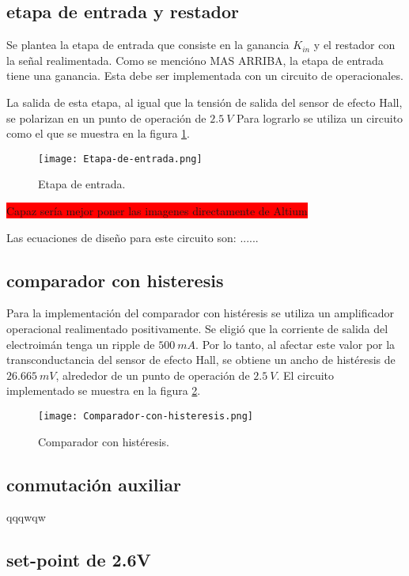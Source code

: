 \subsection{etapa de entrada y restador}


Se plantea la etapa de entrada que consiste en la ganancia $K_{in}$ y el restador con la señal realimentada. Como se mencióno MAS ARRIBA, la etapa de entrada tiene una ganancia. Esta debe ser implementada con un circuito de operacionales.

La salida de esta etapa, al igual que la tensión de salida del sensor de efecto Hall, se polarizan en un punto de operación de $2.5\:V$ Para lograrlo se utiliza un circuito como el que se muestra en la figura \ref{fig:img_etapa-de-entrada}.


\begin{figure}[H]
	\centering
	\texttt{[image: Etapa-de-entrada.png]}
	\caption{Etapa de entrada.}
	\label{fig:img_etapa-de-entrada}
\end{figure}
\colorbox{red}{Capaz sería mejor poner las imagenes directamente de Altium}

Las ecuaciones de diseño para este circuito son: ......


\subsection{comparador con histeresis}

Para la implementación del comparador con histéresis se utiliza un amplificador operacional realimentado positivamente. Se eligió que la corriente de salida del electroimán tenga un ripple de $500\:mA$. Por lo tanto, al afectar este valor por la transconductancia del sensor de efecto Hall, se obtiene un ancho de histéresis de $26.665\:mV$, alrededor de un punto de operación de $2.5\:V$. El circuito implementado se muestra en la figura \ref{fig:img_comp-con-hist}.

\begin{figure}[H]
	\centering
	\texttt{[image: Comparador-con-histeresis.png]}
	\caption{Comparador con histéresis.}
	\label{fig:img_comp-con-hist}
\end{figure}

\subsection{conmutación auxiliar}
qqqwqw
\subsection{set-point de 2.6V}
 